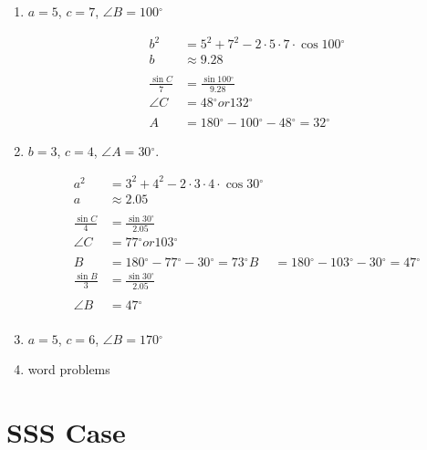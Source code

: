 \documentclass{exam}
\newcommand{\dg}{\ensuremath{^\circ}}
\begin{document}
  \begin{enumerate}
    \item $a = 5$, $c = 7$, $\angle B = 100 \dg$
      \begin{solution}
        \begin{align*}
          b^2 & = 5^2 + 7^2 - 2 \cdot 5 \cdot 7 \cdot \cos 100 \dg \\
          b   & \approx 9.28 \\
          \\
          \frac{\sin C}{7} &= \frac{\sin 100 \dg}{9.28} \\
          \angle C &= 48 \dg { or } 132 \dg \\
          \\
          A &= 180 \dg - 100 \dg - 48 \dg = 32 \dg
        \end{align*}
      \end{solution}

    \item $b = 3$, $c = 4$, $\angle A = 30 \dg$.  
      \begin{solution}
        \begin{align*}
          a^2 & = 3^2 + 4^2 - 2 \cdot 3 \cdot 4 \cdot \cos 30 \dg \\
          a   & \approx 2.05 \\
          \\
          \frac{\sin C}{4} & = \frac{\sin 30 \dg}{2.05} \\
          \angle C         & = 77 \dg { or } 103 \dg \\
          \\
          B &= 180 \dg - 77 \dg - 30 \dg = 73 \dg
          B &= 180 \dg - 103 \dg - 30 \dg = 47 \dg
          \\
          \frac{\sin B}{3} &= \frac{\sin 30 \dg}{2.05} \\
          \\
          \angle B &= 47 \dg \\
        \end{align*}
      \end{solution}

    \item $a = 5$, $c = 6$, $\angle B = 170 \dg$

    \item word problems

  \end{enumerate}

  \section{SSS Case}
\end{document}
